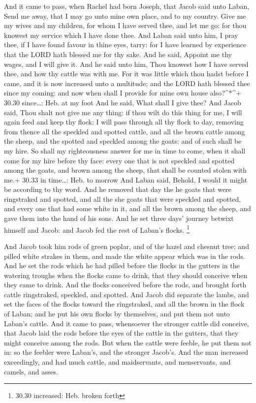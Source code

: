  And it came to pass, when Rachel had born Joseph, that
Jacob said unto Laban, Send me away, that I may go unto mine own place,
and to my country.  Give me my wives and my children, for
whom I have served thee, and let me go: for thou knowest my service
which I have done thee.  And Laban said unto him, I pray
thee, if I have found favour in thine eyes, tarry: for I have learned by
experience that the LORD hath blessed me for thy sake.  And
he said, Appoint me thy wages, and I will give it.  And he
said unto him, Thou knowest how I have served thee, and how thy cattle
was with me.  For it was little which thou hadst before I
came, and it is now increased unto a multitude; and the LORD hath
blessed thee since my coming: and now when shall I provide for mine own
house also?\^{}*\^{}+ 30.30 since\ldots: Heb. at my foot 
And he said, What shall I give thee? And Jacob said, Thou shalt not give
me any thing: if thou wilt do this thing for me, I will again feed and
keep thy flock:  I will pass through all thy flock to day,
removing from thence all the speckled and spotted cattle, and all the
brown cattle among the sheep, and the spotted and speckled among the
goats: and of such shall be my hire.  So shall my
righteousness answer for me in time to come, when it shall come for my
hire before thy face: every one that is not speckled and spotted among
the goats, and brown among the sheep, that shall be counted stolen with
me.+ 30.33 in time\ldots: Heb. to morrow  And Laban said,
Behold, I would it might be according to thy word.  And he
removed that day the he goats that were ringstraked and spotted, and all
the she goats that were speckled and spotted, and every one that had
some white in it, and all the brown among the sheep, and gave them into
the hand of his sons.  And he set three days' journey
betwixt himself and Jacob: and Jacob fed the rest of Laban's flocks.
\footnote{30.30 increased: Heb. broken forth}

 And Jacob took him rods of green poplar, and of the hazel
and chesnut tree; and pilled white strakes in them, and made the white
appear which was in the rods.  And he set the rods which he
had pilled before the flocks in the gutters in the watering troughs when
the flocks came to drink, that they should conceive when they came to
drink.  And the flocks conceived before the rods, and
brought forth cattle ringstraked, speckled, and spotted. 
And Jacob did separate the lambs, and set the faces of the flocks toward
the ringstraked, and all the brown in the flock of Laban; and he put his
own flocks by themselves, and put them not unto Laban's cattle.
 And it came to pass, whensoever the stronger cattle did
conceive, that Jacob laid the rods before the eyes of the cattle in the
gutters, that they might conceive among the rods.  But when
the cattle were feeble, he put them not in: so the feebler were Laban's,
and the stronger Jacob's.  And the man increased
exceedingly, and had much cattle, and maidservants, and menservants, and
camels, and asses.

